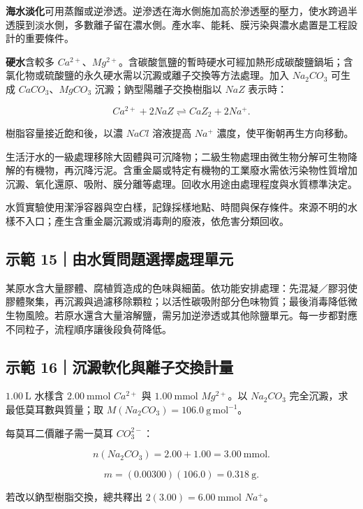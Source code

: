 \documentclass[11pt,a4paper]{article}
\begin{document}
\textbf{海水淡化}可用蒸餾或逆滲透。逆滲透在海水側施加高於滲透壓的壓力，使水跨過半透膜到淡水側，多數離子留在濃水側。產水率、能耗、膜污染與濃水處置是工程設計的重要條件。

\textbf{硬水}含較多 \(Ca^{2+}\)、\(Mg^{2+}\)。含碳酸氫鹽的暫時硬水可經加熱形成碳酸鹽鍋垢；含氯化物或硫酸鹽的永久硬水需以沉澱或離子交換等方法處理。加入 \(Na_2CO_3\) 可生成 \(CaCO_3\)、\(MgCO_3\) 沉澱；鈉型陽離子交換樹脂以 \(NaZ\) 表示時：

\[
Ca^{2+}+2NaZ\rightleftharpoons CaZ_2+2Na^+.
\]

樹脂容量接近飽和後，以濃 \(NaCl\) 溶液提高 \(Na^+\) 濃度，使平衡朝再生方向移動。

生活汙水的一級處理移除大固體與可沉降物；二級生物處理由微生物分解可生物降解的有機物，再沉降污泥。含重金屬或特定有機物的工業廢水需依污染物性質增加沉澱、氧化還原、吸附、膜分離等處理。回收水用途由處理程度與水質標準決定。

水質實驗使用潔淨容器與空白樣，記錄採樣地點、時間與保存條件。來源不明的水樣不入口；產生含重金屬沉澱或消毒劑的廢液，依危害分類回收。

\begin{HandoutWorkedExample}

\subsection{示範 15｜由水質問題選擇處理單元}\label{ux793aux7bc4-15ux7531ux6c34ux8ceaux554fux984cux9078ux64c7ux8655ux7406ux55aeux5143}

某原水含大量膠體、腐植質造成的色味與細菌。依功能安排處理：先混凝／膠羽使膠體聚集，再沉澱與過濾移除顆粒；以活性碳吸附部分色味物質；最後消毒降低微生物風險。若原水還含大量溶解鹽，需另加逆滲透或其他除鹽單元。每一步都對應不同粒子，流程順序讓後段負荷降低。

\end{HandoutWorkedExample}

\begin{HandoutWorkedExample}

\subsection{示範 16｜沉澱軟化與離子交換計量}\label{ux793aux7bc4-16ux6c89ux6fb1ux8edfux5316ux8207ux96e2ux5b50ux4ea4ux63dbux8a08ux91cf}

\(1.00\ \mathrm L\) 水樣含 \(2.00\ \mathrm{mmol}\) \(Ca^{2+}\) 與 \(1.00\ \mathrm{mmol}\) \(Mg^{2+}\)。以 \(Na_2CO_3\) 完全沉澱，求最低莫耳數與質量；取 \(M(Na_2CO_3)=106.0\ \mathrm{g\,mol^{-1}}\)。

每莫耳二價離子需一莫耳 \(CO_3^{2-}\)：

\[
n(Na_2CO_3)=2.00+1.00=3.00\ \mathrm{mmol}.
\]

\[
m=(0.00300)(106.0)=0.318\ \mathrm g.
\]

若改以鈉型樹脂交換，總共釋出 \(2(3.00)=6.00\ \mathrm{mmol}\) \(Na^+\)。

\end{HandoutWorkedExample}
\end{document}
